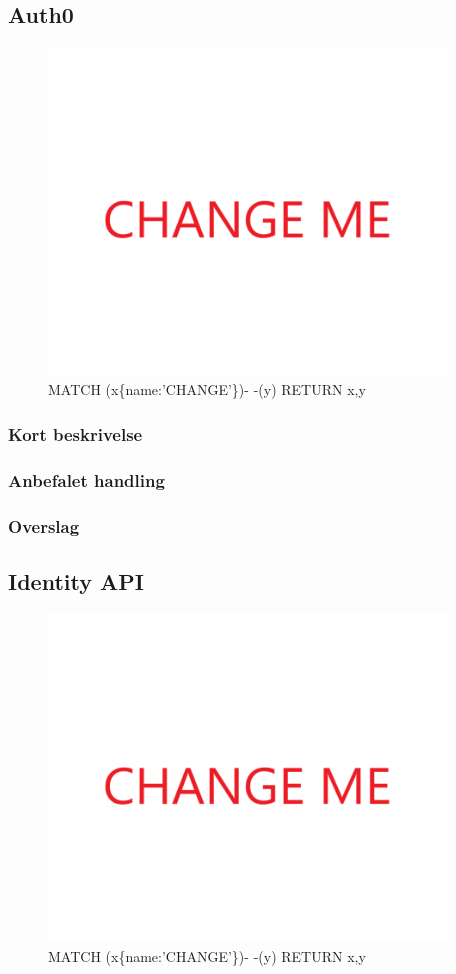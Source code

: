 \documentclass{article}
\begin{document}
\subsection{Auth0}
\begin{figure}[h]
\includegraphics[width=300pt]{CHANGE.PNG}
\caption{MATCH (x\{name:'CHANGE'\})- -(y) RETURN x,y}
\end{figure}
\subsubsection{Kort beskrivelse}
\subsubsection{Anbefalet handling}
\subsubsection{Overslag}
\subsection{Identity API}
\begin{figure}[h]
\includegraphics[width=300pt]{CHANGE.PNG}
\caption{MATCH (x\{name:'CHANGE'\})- -(y) RETURN x,y}
\end{figure}
\end{document}
